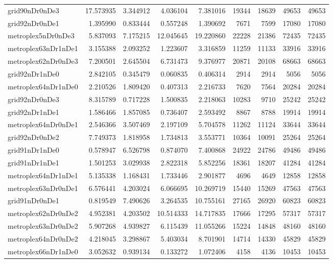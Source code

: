 \begin{longtable}{|l|r|r|r|r|r|r|r|r|}
grid90nDr0nDe3 & 17.573935 & 3.344912 & 4.036104 & 7.381016 & 19344 & 18639 & 49653 & 49653 \\
grid92nDr0nDe1 & 1.395990 & 0.833444 & 0.557248 & 1.390692 & 7671 & 7599 & 17080 & 17080 \\
metroplex5nDr0nDe3 & 5.837093 & 7.175215 & 12.045645 & 19.220860 & 22228 & 21386 & 72435 & 72435 \\
metroplex63nDr1nDe1 & 3.155388 & 2.093252 & 1.223607 & 3.316859 & 11259 & 11133 & 33916 & 33916 \\
metroplex62nDr0nDe3 & 7.200501 & 2.645504 & 6.731473 & 9.376977 & 20871 & 20108 & 68663 & 68663 \\
grid92nDr1nDe0 & 2.842105 & 0.345479 & 0.060835 & 0.406314 & 2914 & 2914 & 5056 & 5056 \\
metroplex64nDr1nDe0 & 2.210526 & 1.809420 & 0.407313 & 2.216733 & 7620 & 7564 & 20284 & 20284 \\
grid92nDr0nDe3 & 8.315789 & 0.717228 & 1.500835 & 2.218063 & 10283 & 9710 & 25242 & 25242 \\
grid92nDr1nDe1 & 1.586466 & 1.857085 & 0.736407 & 2.593492 & 8867 & 8788 & 19914 & 19914 \\
metroplex64nDr0nDe1 & 2.546366 & 3.507469 & 2.197109 & 5.704578 & 11262 & 11124 & 33644 & 33644 \\
grid92nDr0nDe2 & 7.749373 & 1.818958 & 1.734813 & 3.553771 & 10364 & 10091 & 25264 & 25264 \\
grid91nDr1nDe0 & 0.578947 & 6.526798 & 0.874070 & 7.400868 & 24922 & 24786 & 49486 & 49486 \\
grid91nDr1nDe1 & 1.501253 & 3.029938 & 2.822318 & 5.852256 & 18361 & 18207 & 41284 & 41284 \\
metroplex64nDr1nDe1 & 5.135338 & 1.168431 & 1.733446 & 2.901877 & 4696 & 4649 & 12858 & 12858 \\
metroplex63nDr0nDe1 & 6.576441 & 4.203024 & 6.066695 & 10.269719 & 15440 & 15269 & 47563 & 47563 \\
grid91nDr0nDe1 & 0.819549 & 7.490626 & 3.264535 & 10.755161 & 27165 & 26920 & 60823 & 60823 \\
metroplex62nDr0nDe2 & 4.952381 & 4.203502 & 10.514333 & 14.717835 & 17666 & 17295 & 57317 & 57317 \\
metroplex63nDr0nDe2 & 5.907268 & 4.939827 & 6.115439 & 11.055266 & 15224 & 14848 & 48160 & 48160 \\
metroplex64nDr0nDe2 & 4.218045 & 3.298867 & 5.403034 & 8.701901 & 14714 & 14330 & 45829 & 45829 \\
metroplex66nDr1nDe0 & 3.052632 & 0.939134 & 0.133272 & 1.072406 & 4158 & 4136 & 10453 & 10453 \\

\end{longtable}
